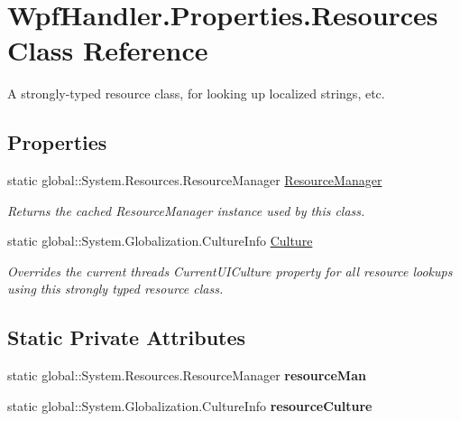 \hypertarget{class_wpf_handler_1_1_properties_1_1_resources}{}\section{Wpf\+Handler.\+Properties.\+Resources Class Reference}
\label{class_wpf_handler_1_1_properties_1_1_resources}


A strongly-\/typed resource class, for looking up localized strings, etc.  


\subsection*{Properties}
\begin{DoxyCompactItemize}
\item 
static global\+::\+System.\+Resources.\+Resource\+Manager \mbox{\hyperlink{class_wpf_handler_1_1_properties_1_1_resources_a4908c4924066b6d42cc0e042fdae5079}{Resource\+Manager}}
\begin{DoxyCompactList}\small\item\em Returns the cached Resource\+Manager instance used by this class. \end{DoxyCompactList}\item 
static global\+::\+System.\+Globalization.\+Culture\+Info \mbox{\hyperlink{class_wpf_handler_1_1_properties_1_1_resources_a9d6eb037cf7891a3ed5b2370e7dfdc23}{Culture}}
\begin{DoxyCompactList}\small\item\em Overrides the current thread\textquotesingle{}s Current\+U\+I\+Culture property for all resource lookups using this strongly typed resource class. \end{DoxyCompactList}\end{DoxyCompactItemize}
\subsection*{Static Private Attributes}
\begin{DoxyCompactItemize}
\item 
\mbox{\label{class_wpf_handler_1_1_properties_1_1_resources_a70255d9bbf2306b40e8bed65c3ec52ae}} 
static global\+::\+System.\+Resources.\+Resource\+Manager {\bfseries resource\+Man}
\item 
\mbox{\label{class_wpf_handler_1_1_properties_1_1_resources_a32f5b165404b01ed52a1aa141dbee00f}} 
static global\+::\+System.\+Globalization.\+Culture\+Info {\bfseries resource\+Culture}
\end{DoxyCompactItemize}


